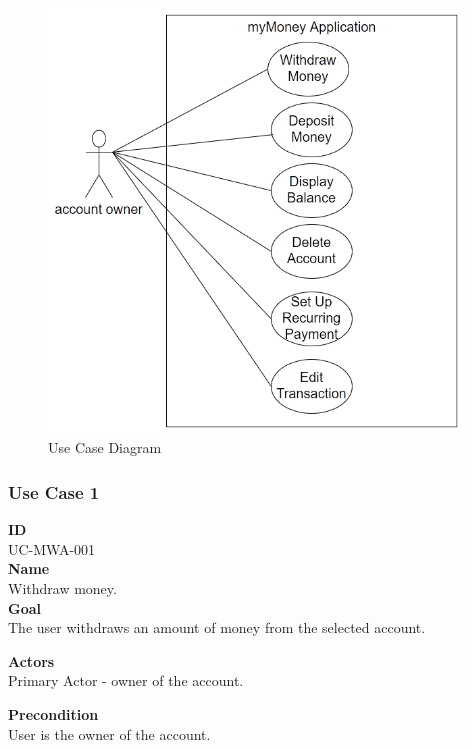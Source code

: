 \documentclass[12pt]{article}
\begin{document}
\begin{figure}[h!]
  \centering
  \includegraphics[width=110mm,natwidth=616,natheight=631]{Use_Case_Diagram.png}
  \caption{Use Case Diagram}
  \label{fig:use_case_diagram}
\end{figure}

\subsubsection{Use Case 1} \label{uc:1}

\noindent
{\bf ID}\\
UC-MWA-001\\
    
\noindent
{\bf Name}\\
Withdraw money.\\

\noindent
{\bf Goal}\\
The user withdraws an amount of money from the selected account.

\noindent
{\bf Actors}\\
Primary Actor - owner of the account.

\noindent
{\bf Precondition}\\
User is the owner of the account.
\end{document}
